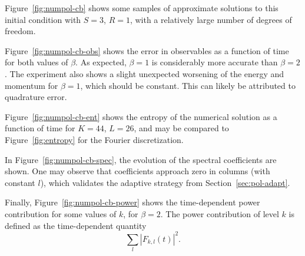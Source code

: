 Figure~\vref{fig:numpol-cb} shows some samples of approximate solutions to this initial condition with $S=3$,
$R=1$, with a relatively large number of degrees of freedom.

Figure~\vref{fig:numpol-cb-obs} shows the error in observables as a function of time for both values of
$\beta$. As expected, $\beta=1$ is considerably more accurate than $\beta=2$. The experiment also shows a
slight unexpected worsening of the energy and momentum for $\beta=1$, which should be constant. This can
likely be attributed to quadrature error.

Figure~\vref{fig:numpol-cb-ent} shows the entropy of the numerical solution as a function of time for $K=44$,
$L=26$, and may be compared to Figure~\ref{fig:entropy} for the Fourier discretization.

In Figure~\vref{fig:numpol-cb-spec}, the evolution of the spectral coefficients are shown. One may observe
that coefficients approach zero in columns (with constant $l$), which validates the adaptive strategy from
Section~\ref{sec:pol-adapt}.

Finally, Figure~\vref{fig:numpol-cb-power} shows the time-dependent power contribution for some values of $k$,
for $\beta=2$. The power contribution of level $k$ is defined as the time-dependent quantity
\[
    \sum_l |F_{k,l}(t)|^2.
\]

